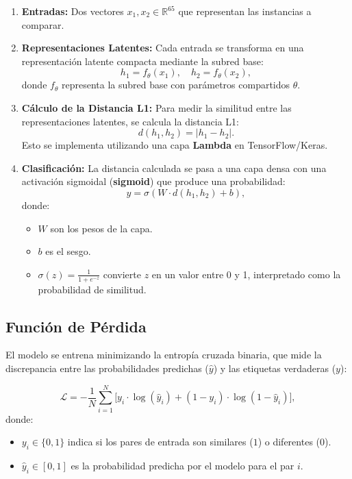 \begin{enumerate}
    \item \textbf{Entradas:} Dos vectores \( x_1, x_2 \in \mathbb{R}^{65} \) que representan las instancias a comparar.

    \item \textbf{Representaciones Latentes:} Cada entrada se transforma en una representación latente compacta mediante la subred base:
    \[
    h_1 = f_\theta(x_1), \quad h_2 = f_\theta(x_2),
    \]
    donde \( f_\theta \) representa la subred base con parámetros compartidos \( \theta \).

    \item \textbf{Cálculo de la Distancia L1:} Para medir la similitud entre las representaciones latentes, se calcula la distancia L1:
    \[
    d(h_1, h_2) = |h_1 - h_2|.
    \]
    Esto se implementa utilizando una capa \textbf{Lambda} en TensorFlow/Keras.

    \item \textbf{Clasificación:} La distancia calculada se pasa a una capa densa con una activación sigmoidal (\textbf{sigmoid}) que produce una probabilidad:
    \[
    \hat{y} = \sigma(W \cdot d(h_1, h_2) + b),
    \]
    donde:
    \begin{itemize}
        \item \( W \) son los pesos de la capa.
        \item \( b \) es el sesgo.
        \item \( \sigma(z) = \frac{1}{1 + e^{-z}} \) convierte \( z \) en un valor entre 0 y 1, interpretado como la probabilidad de similitud.
    \end{itemize}
\end{enumerate}

\subsection{Función de Pérdida}

El modelo se entrena minimizando la entropía cruzada binaria, que mide la discrepancia entre las probabilidades predichas (\( \hat{y} \)) y las etiquetas verdaderas (\( y \)):

\[
\mathcal{L} = - \frac{1}{N} \sum_{i=1}^N \Big[ y_i \cdot \log(\hat{y}_i) + (1 - y_i) \cdot \log(1 - \hat{y}_i) \Big],
\]
donde:
\begin{itemize}
    \item \( y_i \in \{0, 1\} \) indica si los pares de entrada son similares (\(1\)) o diferentes (\(0\)).
    \item \( \hat{y}_i \in [0, 1] \) es la probabilidad predicha por el modelo para el par \( i \).
\end{itemize}

